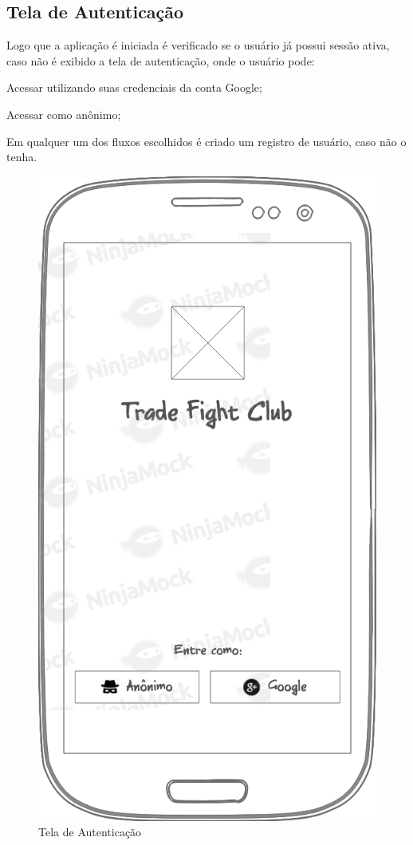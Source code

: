 \subsection{Tela de Autenticação}
Logo que a aplicação é iniciada é verificado se o usuário já possui sessão ativa, caso não é exibido a tela de autenticação, onde o usuário pode:

\begin{lista}
  \item Acessar utilizando suas credenciais da conta Google;
  \item Acessar como anônimo;
\end{lista}

Em qualquer um dos fluxos escolhidos é criado um registro de usuário, caso não o tenha.

\begin{figure}[H]
  \caption{\label{fig:mock_login}Tela de Autenticação}
  \centering
  \includegraphics[scale=0.4]{imagens/mocks/login.png}
\end{figure}


